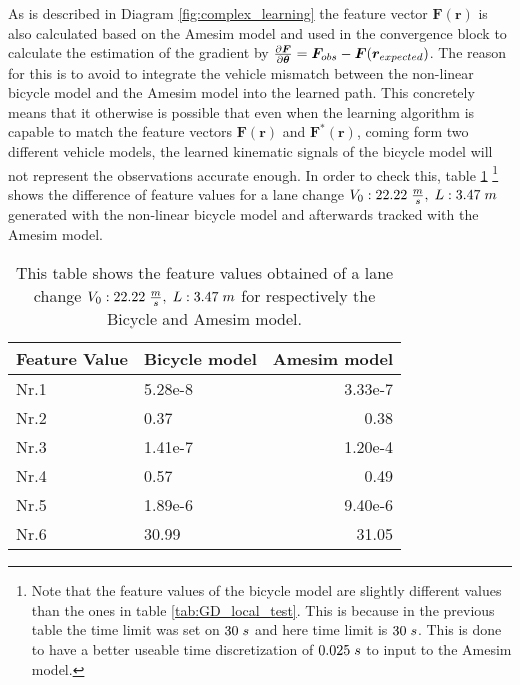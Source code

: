 As is described in Diagram \ref{fig:complex_learning} the feature vector $\bm{F}(\bm{r})$ is also calculated based on the Amesim model and used in the convergence block to calculate the estimation of the gradient by $\pdv{\bm{F}}{\bm{\theta}} = \bm{F}_{obs} - \bm{F}(\bm{r}_{expected})$. The reason for this is to avoid to integrate the vehicle mismatch between the non-linear bicycle model and the Amesim model into the learned path. This concretely means that it otherwise is possible that even when the learning algorithm is capable to match the feature vectors $\bm{F}(\bm{r})$ and  $\bm{F}^*(\bm{r})$, coming form two different vehicle models, the learned kinematic signals of the bicycle model will not represent the observations accurate enough. In order to check this, table \ref{tab:comparinson_models} \footnote{Note that the feature values of the bicycle model are slightly different values than the ones in table \ref{tab:GD_local_test}. This is because in the previous table the time limit was set on $30 \hspace{1mm}s$ and here time limit is $30 \hspace{1mm}s$. This is done to have a better useable time discretization of $0.025\hspace{1mm}s$ to input to the Amesim model.} shows the difference of feature values for a lane change $V_0:22.22\hspace{1mm}\frac{m}{s},\hspace{1mm} L:3.47\hspace{1mm}m$ generated with the non-linear bicycle model and afterwards tracked with the Amesim model.\\

\newpage

\begin{table}[h!]
	\centering
	\begin{tabular}{@{}llr@{}} \toprule
		Feature Value    & Bicycle model & Amesim model\\ \midrule
		Nr.1       		 & 5.28e-8    & 3.33e-7 \\
		Nr.2       		 & 0.37       & 0.38  \\
		Nr.3       		 & 1.41e-7    & 1.20e-4 \\
		Nr.4       		 & 0.57       & 0.49  \\
		Nr.5       		 & 1.89e-6    & 9.40e-6 \\
		Nr.6       		 & 30.99      & 31.05\\ \bottomrule
	\end{tabular}
	\caption{This table shows the feature values obtained of a lane change $V_0:22.22\hspace{1mm}\frac{m}{s},\hspace{1mm} L:3.47\hspace{1mm}m$ for respectively the Bicycle and Amesim model.}
	\label{tab:comparinson_models}
\end{table}

